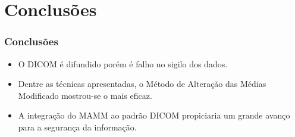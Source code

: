 \documentclass{beamer}
\begin{document}
\section{Conclusões}
\begin{frame}[fragile] %
\frametitle{Conclusões}
\begin{itemize}

\item O DICOM é difundido porém é falho no sigilo dos dados.\newline

\item Dentre as técnicas apresentadas, o Método de Alteração das Médias Modificado mostrou-se o mais eficaz.\newline

\item A integração do MAMM ao padrão DICOM propiciaria um grande avanço para a segurança da informação.\newline

\end{itemize}
\end{frame}
\end{document}
